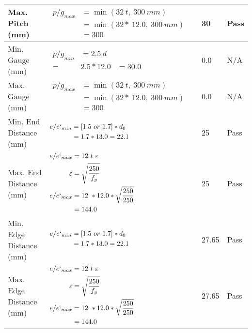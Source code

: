 \documentclass{article}%
\begin{document}
\begin{longtable}{|p{4cm}|p{5cm}|p{5.5cm}|p{1.5cm}|}
\hline%
Max. Pitch (mm)&$\begin{aligned}p/g_{max} &=\min(32~t,~300~mm)&\\ &=\min(32 *~12.0,~ 300 ~mm)\\&=300\end{aligned}$&30&Pass\\%
\hline%
Min. Gauge (mm)&$\begin{aligned}p/g_{min}&= 2.5 ~ d&\\ =&2.5*12.0&=30.0\end{aligned}$&0.0&N/A\\%
\hline%
Max. Gauge (mm)&$\begin{aligned}p/g_{max} &=\min(32~t,~300~mm)&\\ &=\min(32 *~12.0,~ 300 ~mm)\\&=300\end{aligned}$&0.0&N/A\\%
\hline%
Min. End Distance (mm)&$\begin{aligned}e/e`_{min} &=[1.5~or~ 1.7] * d_0\\ &=1.7*13.0=22.1 \end{aligned}$&25&Pass\\%
\hline%
Max. End Distance (mm)&$\begin{aligned}e/e`_{max} &= 12~ t~ \varepsilon&\\ \varepsilon &= \sqrt{\frac{250}{f_y}}\\ e/e`_{max}&=12 ~*12.0*\sqrt{\frac{250}{250}}\\ &=144.0\\ \end{aligned}$&25&Pass\\%
\hline%
Min. Edge Distance (mm)&$\begin{aligned}e/e`_{min} &=[1.5~or~ 1.7] * d_0\\ &=1.7*13.0=22.1 \end{aligned}$&27.65&Pass\\%
\hline%
Max. Edge Distance (mm)&$\begin{aligned}e/e`_{max} &= 12~ t~ \varepsilon&\\ \varepsilon &= \sqrt{\frac{250}{f_y}}\\ e/e`_{max}&=12 ~*12.0*\sqrt{\frac{250}{250}}\\ &=144.0\\ \end{aligned}$&27.65&Pass\\%
\hline%

\end{longtable}
\end{document}
